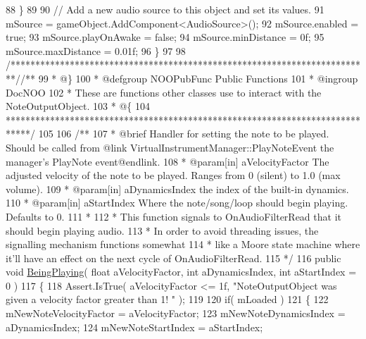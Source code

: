 \begin{DoxyCodeInclude}
88         \}
89 
90         \textcolor{comment}{// Add a new audio source to this object and set its values.}
91         mSource = gameObject.AddComponent<AudioSource>();
92         mSource.enabled = \textcolor{keyword}{true};
93         mSource.playOnAwake = \textcolor{keyword}{false};
94         mSource.minDistance = 0f;
95         mSource.maxDistance = 0.01f;
96     \}
97 
98     \textcolor{comment}{/*************************************************************************/}\textcolor{comment}{/** }
99 \textcolor{comment}{    * @\}}
100 \textcolor{comment}{    * @defgroup NOOPubFunc Public Functions}
101 \textcolor{comment}{    * @ingroup DocNOO}
102 \textcolor{comment}{    * These are functions other classes use to interact with the NoteOutputObject.}
103 \textcolor{comment}{    * @\{}
104 \textcolor{comment}{    *****************************************************************************/}
105 \textcolor{comment}{}
106 \textcolor{comment}{    /**}
107 \textcolor{comment}{    * @brief Handler for setting the note to be played. Should be called from @link
       VirtualInstrumentManager::PlayNoteEvent the manager's PlayNote event@endlink.}
108 \textcolor{comment}{    * @param[in] aVelocityFactor The adjusted velocity of the note to be played. Ranges from 0 (silent) to
       1.0 (max volume).}
109 \textcolor{comment}{    * @param[in] aDynamicsIndex the index of the built-in dynamics.}
110 \textcolor{comment}{    * @param[in] aStartIndex Where the note/song/loop should begin playing. Defaults to 0.}
111 \textcolor{comment}{    * }
112 \textcolor{comment}{    * This function signals to OnAudioFilterRead that it should begin playing audio. }
113 \textcolor{comment}{    * In order to avoid threading issues, the signalling mechanism functions somewhat }
114 \textcolor{comment}{    * like a Moore state machine where it'll have an effect on the next cycle of OnAudioFilterRead.}
115 \textcolor{comment}{    */}
116     \textcolor{keyword}{public} \textcolor{keywordtype}{void} \hyperlink{group___n_o_o_pub_func_ga2bdaa2787408f353f71ef6c6a18e9285}{BeingPlaying}( \textcolor{keywordtype}{float} aVelocityFactor, \textcolor{keywordtype}{int} aDynamicsIndex, \textcolor{keywordtype}{int} aStartIndex = 0 )
117     \{
118         Assert.IsTrue( aVelocityFactor <= 1f, \textcolor{stringliteral}{"NoteOutputObject was given a velocity factor greater than 1!
      "} );
119 
120         \textcolor{keywordflow}{if}( mLoaded )
121         \{
122             mNewNoteVelocityFactor = aVelocityFactor;
123             mNewNoteDynamicsIndex = aDynamicsIndex;
124             mNewNoteStartIndex = aStartIndex;

\end{DoxyCodeInclude}
